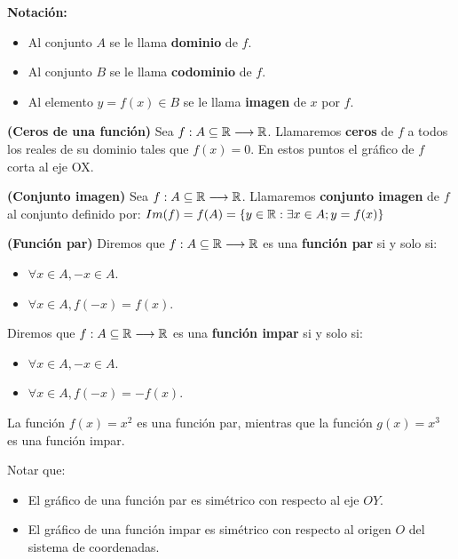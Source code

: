 \textbf{Notación:} 
\begin{itemize}
	\item Al conjunto $A$ se le llama \textbf{dominio} de $f$. 
	\item Al conjunto $B$ se le llama \textbf{codominio} de $f$. 
	\item Al elemento $y = f(x) \in B$ se le llama \textbf{imagen} de $x$ por $f$. 
\end{itemize}

\begin{definicion}
	\textbf{(Ceros de una función)}
	Sea $f: A \subseteq \mathbb{R} \longrightarrow \mathbb{R}$. Llamaremos \textbf{ceros} de $f$ a todos los reales de su dominio tales que $f(x) = 0$. En estos puntos  el gráfico de $f$ corta al eje OX. 
\end{definicion}

\begin{definicion}
	\textbf{(Conjunto imagen)}
	Sea $f: A \subseteq \mathbb{R} \longrightarrow \mathbb{R}$. Llamaremos \textbf{conjunto imagen} de $f$ al conjunto definido por: 
	$ Im(f) = f(A) = \{ y \in \mathbb{R}: \exists x \in A; y = f(x) \} $ 
\end{definicion}

\begin{definicion}
	\textbf{(Función par)}
	Diremos que $f: A \subseteq \mathbb{R} \longrightarrow \mathbb{R}$ es una \textbf{función par} si y solo si: 
	\begin{itemize} 
		\item $\forall x \in A, -x \in A$. 
		\item $\forall x \in A, f(-x) = f(x)$.
	\end{itemize} 	
\end{definicion}

\begin{definicion}
	Diremos que $f: A \subseteq \mathbb{R} \longrightarrow \mathbb{R}$ es una \textbf{función impar} si y solo si: 
	\begin{itemize}
		\item $\forall x \in A, -x \in A$. 
		\item $\forall x \in A, f(-x) = - f(x)$. 
	\end{itemize} 
\end{definicion}

\begin{ejemplo}
	La función $f(x) = x^2$ es una función par, mientras que la función $g(x) = x^3$ es una función impar. 
\end{ejemplo}

\begin{nota}
	Notar que: 
	\begin{itemize}
		\item El gráfico de una función par es simétrico con respecto al eje $OY$. 
		\item El gráfico de una función impar es simétrico con respecto al origen $O$ del sistema de coordenadas. 
	\end{itemize}
\end{nota}


